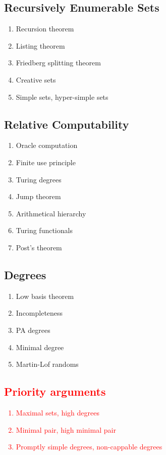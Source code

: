 \documentclass{article}
\newcommand{\MAYBE}[1]{\textcolor{red}{#1}}
\begin{document}
\subsection{Recursively Enumerable Sets} 
\begin{enumerate}
  \item Recursion theorem
  \item Listing theorem
  \item Friedberg splitting theorem
  \item Creative sets
  \item Simple sets, hyper-simple sets
\end{enumerate}

\subsection{Relative Computability} 
\begin{enumerate}
  \item Oracle computation
  \item Finite use principle
  \item Turing degrees
  \item Jump theorem
  \item Arithmetical hierarchy
  \item Turing functionals
  \item Post's theorem
\end{enumerate}

\subsection{Degrees} 
\begin{enumerate}
  \item Low basis theorem
  \item Incompleteness
  \item PA degrees
  \item Minimal degree
  \item Martin-Lof randoms
\end{enumerate}

\MAYBE{
\subsection{Priority arguments} 
\begin{enumerate}
  \item Maximal sets, high degrees
  \item Minimal pair, high minimal pair
  \item Promptly simple degrees, non-cappable degrees
\end{enumerate}
}
\end{document}
